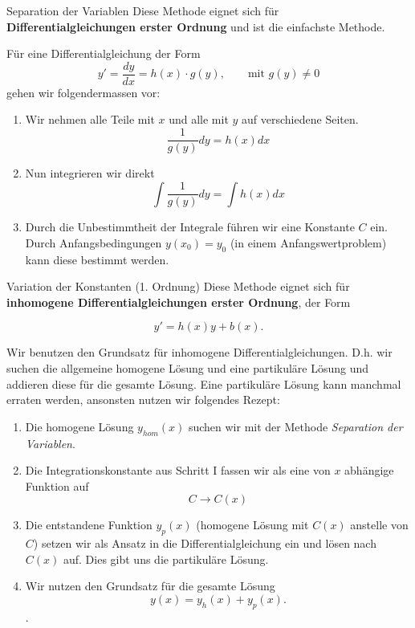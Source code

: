 \begin{Rezept}{Separation der Variablen}{}
	Diese Methode eignet sich für \textbf{Differentialgleichungen erster Ordnung} und ist die einfachste Methode.
	
	Für eine Differentialgleichung der Form
	\begin{equation*}
	y' =\frac{dy}{dx}= h(x)\cdot g(y), \qquad \text{mit } g(y)\neq 0
	\end{equation*}
	gehen wir folgendermassen vor:
	\begin{enumerate}
		\item Wir nehmen alle Teile mit $x$ und alle mit $y$ auf verschiedene Seiten.
		\begin{equation*}
		\frac{1}{g(y)} dy=h(x)dx
		\end{equation*}
		\item Nun integrieren wir direkt
		\begin{equation*}
		\int \frac{1}{g(y)}dy = \int h(x) dx
		\end{equation*}
		\item Durch die Unbestimmtheit der Integrale führen wir eine Konstante $C$ ein. Durch Anfangsbedingungen $y(x_0)=y_0$ (in einem Anfangswertproblem) kann diese bestimmt werden.
	\end{enumerate}
\end{Rezept}

\begin{Rezept}{Variation der Konstanten (1. Ordnung)}{}
	Diese Methode eignet sich für \textbf{inhomogene Differentialgleichungen erster Ordnung}, der Form
	
	\begin{equation*}
	y' = h(x) y + b(x).
	\end{equation*}
	
	Wir benutzen den Grundsatz für inhomogene Differentialgleichungen. D.h. wir suchen die allgemeine homogene Lösung und eine partikuläre Lösung und addieren diese für die gesamte Lösung. Eine partikuläre Lösung kann manchmal erraten werden, ansonsten nutzen wir folgendes Rezept:
	
	\begin{enumerate}
		\item Die homogene Lösung $y_{hom}(x)$ suchen wir mit der Methode \textit{Separation der Variablen}.
		\item Die Integrationskonstante aus Schritt I fassen wir als eine von $x$ abhängige Funktion auf
		\begin{equation*}
		C \rightarrow C(x)
		\end{equation*}
		\item Die entstandene Funktion $y_p(x)$ (homogene Lösung mit $C(x)$ anstelle von $C$) setzen wir als Ansatz in die Differentialgleichung ein und lösen nach $C(x)$ auf. Dies gibt uns die partikuläre Lösung.
		\item  Wir nutzen den Grundsatz für die gesamte Lösung
		\begin{equation*}
		y(x) = y_h(x) + y_p(x).
		\end{equation*}.
	\end{enumerate}
\end{Rezept}

